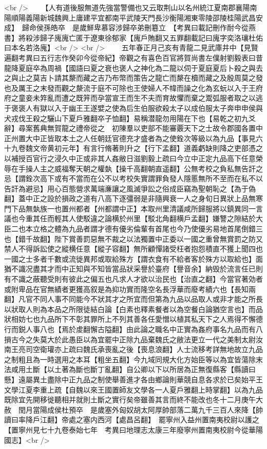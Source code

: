 <br />
　　【人有道後服無道先強當警備也又云取荆山以名州統江夏南郡襄陽南陽順陽義陽新城魏興上庸建平宜都南平武陵天門長沙衡陽湘東零陵邵陵桂陽武昌安成】　歸命侯孫皓卒　是歲鮮卑慕容涉歸卒弟刪簒立　【考異曰載記刪作耐今從燕書】將殺涉歸子廆廆亡匿于遼東徐郁家【廆戶賄翻又五罪翻載記曰廆字奕洛瓖杜佑曰本名若洛廆】<br />
<br />
　　五年春正月己亥有青龍二見武庫井中【見賢遍翻考異曰五行志作癸卯今從帝紀】帝觀之有喜色百官將賀尚書左僕射劉毅表曰昔龍降夏庭卒為周禍【國語曰夏之衰也褒人之神化為二龍以伺于夏庭夏后卜殺之與去之與止之莫吉卜請其漦而藏之吉乃布幣而策告之龍亡而漦在櫝而藏之及殷周莫之發也及厲王之末發而觀之漦流于庭不可除也王使婦人不幃而譟之化為玄蚖以入于王府府之童妾未筓亂而遭之既笄而孕當宣王而生不夫而育故懼而棄之鬻弧服者取之以逃于褒褒人有獄以入于幽王王遂嬖之使為后生伯服欲殺太子以成伯服太子奔申申侯與犬戎伐王殺之驪山下夏戶雅翻卒子恤翻】易稱潜龍勿用陽在下也【易乾之初九爻辭】尋案舊典無賀龍之禮帝從之　初陳羣以吏部不能審覈天下之士故令郡國各置中正州置大中正皆取本土之人任朝廷官德充才盛者為之使銓次等級以為九品【事見六十九卷魏文帝黄初元年】有言行脩著則升之【行下孟翻】道義虧缺則降之吏部憑之以補授百官行之浸久中正或非其人姦敝日滋劉毅上疏曰今立中正定九品高下任意榮辱在手操人主之威福奪天朝之權埶【操千高翻朝直遥翻】公無考校之負私無告訐之忌【謂銓次高下或有不當而在公不以考校失實謂罪負發人隱慝無所不至而在私不以告訐為避忌】用心百態營求萬端亷讓之風滅爭訟之俗成臣竊為聖朝恥之【為于偽翻】蓋中正之設於損政之道有八高下逐彊弱是非隨興衰一人之身旬日異狀上品無寒門下品無埶族一也置州都者【州都謂中正】本取州里清議咸所歸服將以鎮異同一言議也今重其任而輕其人使駁違之論横於州里【駁北角翻横戶孟翻】嫌讐之隙結於大臣二也本立格之體為九品者謂才德有優劣倫輩有首尾也今乃使優劣易地首尾倒錯三也【錯千故翻】陛下賞善罰惡無不裁之以法獨置中正委以一國之重曾無賞罰之防又禁人不得訴訟使之縱横任意【縱子容翻】無所顧憚諸受枉者抱怨積直不獲上聞四也一國之士多者千數或流徙異邦或取給殊方【謂衣食有不給者客於殊方以取給也】面猶不識况盡其才而中正知與不知皆當品狀采譽於臺府【譽音余】納毁於流言任已則有不識之蔽聽受則有彼此之偏五也凡求人才欲以治民也【治直之翻】今當官著効者或附卑品在官無績者更獲高叙是為抑功實而隆空名長浮華而廢考績六也【長知兩翻】凡官不同人事不同能今不狀其才之所宜而但第為九品以品取人或非才能之所長以狀取人則為本品之所限徒結白論【白素也釋素餐者以為空餐白論猶空言也】而品狀相妨七也九品所下不彰其罪所上不列其善各任愛憎以植其私天下之人焉得不懈德行而鋭人事八也【焉於䖍翻懈古隘翻】由此論之職名中正實為姦府事名九品而有八損古今之失莫大於此愚臣以為宜罷中正除九品棄魏氏之敝法更立一代之美制太尉汝南王亮司空衛瓘亦上疏曰魏氏承喪亂之後【喪息浪翻】人士流移考詳無地故立九品之制粗且為一時選用之本耳【粗坐五翻】今九域同規大化方始臣等以為宜皆蕩除末法咸用土斷【以土著為斷也斷丁亂翻】自公卿以下以所居為正無復縣客【縣讀曰懸】遠屬異土盡除中正九品之制使舉善進才各由鄉論則華競自息各求於已矣始平王文學江夏李重上疏【自魏以來王國置師友文學各一人夏戶雅翻上時掌翻】以為九品既除宜先開移徙聽相并就則土斷之實行矣帝雖善其言而終不能改也冬十二月庚午大赦　閏月當陽成侯杜預卒　是歲塞外匈奴胡太阿厚帥部落二萬九千三百人來降【帥讀曰率降戶江翻】帝處之塞内西河【處昌呂翻】　罷寧州入益州置南夷校尉以護之【置寧州見七十九卷泰始七年　考異曰地理志太康三年廢寧州置南夷校尉今從華陽國志】<br />
